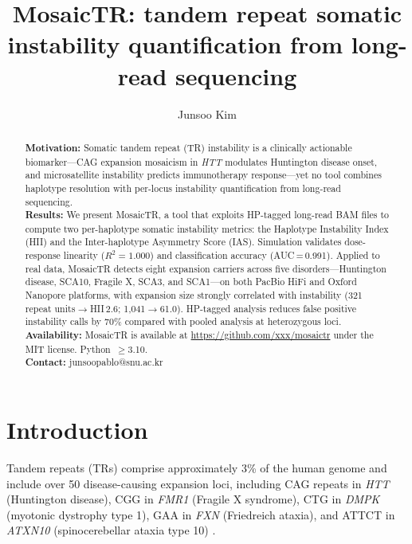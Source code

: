 \documentclass[12pt]{article}
\title{MosaicTR: tandem repeat somatic instability quantification from long-read sequencing}
\author[1]{Junsoo Kim}
\affil[1]{School of Biological Sciences, Seoul National University, Seoul 08826, Republic of Korea}
\date{}
\begin{document}
\maketitle

\begin{abstract}
\noindent
\textbf{Motivation:}
Somatic tandem repeat (TR) instability is a clinically actionable biomarker---CAG expansion mosaicism in \textit{HTT} modulates Huntington disease onset, and microsatellite instability predicts immunotherapy response---yet no tool combines haplotype resolution with per-locus instability quantification from long-read sequencing.
\\[4pt]
\textbf{Results:}
We present MosaicTR, a tool that exploits HP-tagged long-read BAM files to compute two per-haplotype somatic instability metrics: the Haplotype Instability Index (HII) and the Inter-haplotype Asymmetry Score (IAS).
Simulation validates dose-response linearity ($R^2 = 1.000$) and classification accuracy (AUC\,=\,0.991).
Applied to real data, MosaicTR detects eight expansion carriers across five disorders---Huntington disease, SCA10, Fragile X, SCA3, and SCA1---on both PacBio HiFi and Oxford Nanopore platforms, with expansion size strongly correlated with instability (321 repeat units$\to$HII\,2.6; 1{,}041$\to$61.0).
HP-tagged analysis reduces false positive instability calls by 70\% compared with pooled analysis at heterozygous loci.
\\[4pt]
\textbf{Availability:}
MosaicTR is available at \url{https://github.com/xxx/mosaictr} under the MIT license. Python~$\geq$3.10.
\\[4pt]
\textbf{Contact:} junsoopablo@snu.ac.kr
\end{abstract}

\section{Introduction}

Tandem repeats (TRs) comprise approximately 3\% of the human genome and include over 50 disease-causing expansion loci, including CAG repeats in \textit{HTT} (Huntington disease), CGG in \textit{FMR1} (Fragile X syndrome), CTG in \textit{DMPK} (myotonic dystrophy type 1), GAA in \textit{FXN} (Friedreich ataxia), and ATTCT in \textit{ATXN10} (spinocerebellar ataxia type 10) \citep{depienne2021, gall-duncan2019, paulson2018}.
\end{document}
